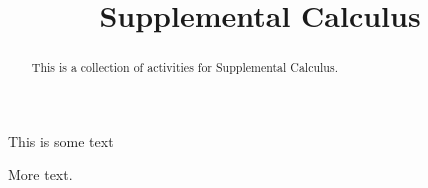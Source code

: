 \documentclass{ximera}
\title{Supplemental Calculus}
\begin{document}
\begin{abstract}
This is a collection of activities for Supplemental Calculus.
\end{abstract}

\maketitle


This is some text 




More text.

%
%
%
%
%
%
%
%
%
\end{document}
